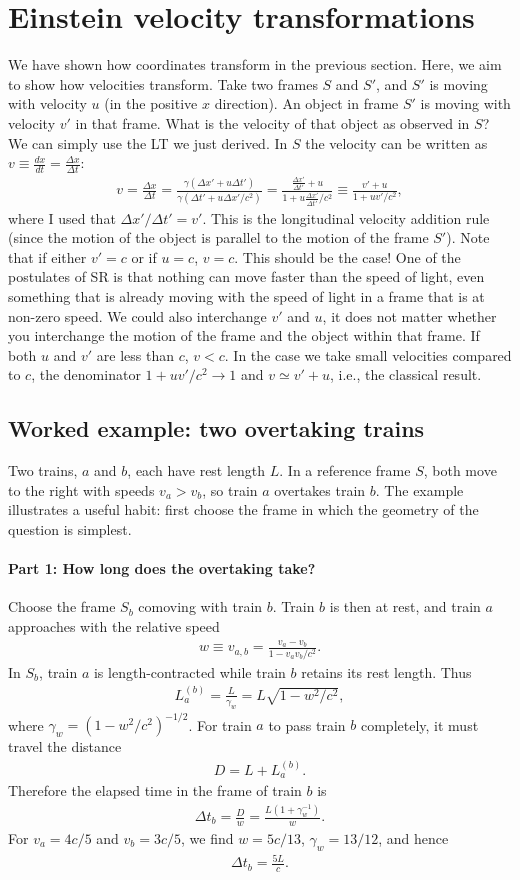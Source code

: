 \documentclass[12pt]{article}
\newcommand{\be}{\begin{eqnarray}}
\newcommand{\ee}{\end{eqnarray}}
\begin{document}
\section{Einstein velocity transformations}\label{sec:EVT}
We have shown how coordinates transform in the previous section. Here, we aim to show how velocities transform. Take two frames $S$ and $S'$, and $S'$ is moving with velocity $u$ (in the positive $x$ direction). An object in frame $S'$ is moving with velocity $v'$ in that frame. What is the velocity of that object as observed in $S$? We can simply use the LT we just derived. In $S$ the velocity can be written as $v \equiv \frac{dx}{dt} = \frac{\Delta x}{\Delta t}$:
\be
v = \frac{\Delta x}{\Delta t} = \frac{\gamma (\Delta x' + u \Delta t')}{\gamma (\Delta t' +  u\Delta x' /c^2)} = \frac{\frac{\Delta x'}{\Delta t'}+u}{1+u \frac{\Delta x'}{\Delta t'}/c^2} \equiv \frac{v' + u}{1+u v'/c^2},
\ee
where I used that $\Delta x'/\Delta t' = v'$. This is the longitudinal velocity addition rule (since the motion of the object is parallel to the motion of the frame $S'$). Note that if either $v' = c$ or if $u  = c$, $v = c$. This should be the case! One of the postulates of SR is that nothing can move faster than the speed of light, even something that is already moving with the speed of light in a frame that is at non-zero speed. We could also interchange $v'$ and $u$, it does not matter whether you interchange the motion of the frame and the object within that frame. If both $u$ and $v'$ are less than $c$, $v < c$. In the case we take small velocities compared to $c$, the denominator $1+ uv'/c^2\rightarrow 1$ and $v \simeq v'+u$, i.e., the classical result.

\subsection*{Worked example: two overtaking trains}
Two trains, $a$ and $b$, each have rest length $L$. In a reference frame $S$, both move to the right with speeds $v_a>v_b$, so train $a$ overtakes train $b$. The example illustrates a useful habit: first choose the frame in which the geometry of the question is simplest.

\paragraph{Part 1: How long does the overtaking take?}
Choose the frame $S_b$ comoving with train $b$. Train $b$ is then at rest, and train $a$ approaches with the relative speed
\be
w \equiv v_{a,b} = \frac{v_a-v_b}{1-v_a v_b/c^2}.
\ee
In $S_b$, train $a$ is length-contracted while train $b$ retains its rest length. Thus
\be
L_a^{(b)} = \frac{L}{\gamma_w}=L\sqrt{1-w^2/c^2},
\ee
where $\gamma_w=(1-w^2/c^2)^{-1/2}$. For train $a$ to pass train $b$ completely, it must travel the distance
\be
D=L+L_a^{(b)}.
\ee
Therefore the elapsed time in the frame of train $b$ is
\be
\Delta t_b = \frac{D}{w}=\frac{L(1+\gamma_w^{-1})}{w}.
\ee
For $v_a=4c/5$ and $v_b=3c/5$, we find $w=5c/13$, $\gamma_w=13/12$, and hence
\be
\Delta t_b=\frac{5L}{c}.
\ee
\end{document}
